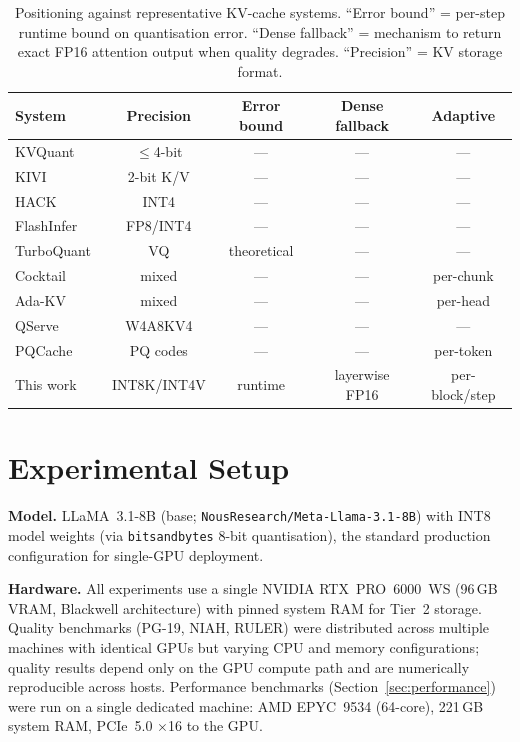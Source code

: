 \documentclass[10pt,twocolumn,a4paper]{article}
\theoremstyle{definition}
\theoremstyle{remark}
\begin{document}
\begin{table}[!t]
\centering
\caption{Positioning against representative KV-cache systems.  ``Error bound'' = per-step runtime bound on quantisation error.  ``Dense fallback'' = mechanism to return exact FP16 attention output when quality degrades.  ``Precision'' = KV storage format.}
\label{tab:positioning}
\small
\begin{tabular}{lcccc}
\toprule
\textbf{System} & \textbf{Precision} & \textbf{Error bound} & \textbf{Dense fallback} & \textbf{Adaptive} \\
\midrule
KVQuant~\cite{kvquant} & $\leq$4-bit & --- & --- & --- \\
KIVI~\cite{kivi} & 2-bit K/V & --- & --- & --- \\
HACK~\cite{hack} & INT4 & --- & --- & --- \\
FlashInfer~\cite{flashinfer} & FP8/INT4 & --- & --- & --- \\
TurboQuant~\cite{turboquant} & VQ & theoretical & --- & --- \\
Cocktail~\cite{cocktail} & mixed & --- & --- & per-chunk \\
Ada-KV~\cite{adakv} & mixed & --- & --- & per-head \\
QServe~\cite{qserve} & W4A8KV4 & --- & --- & --- \\
PQCache~\cite{pqcache} & PQ codes & --- & --- & per-token \\
\midrule
This work & INT8K/INT4V & runtime & layerwise FP16 & per-block/step \\
\bottomrule
\end{tabular}
\end{table}

\section{Experimental Setup}
\label{sec:setup}

\textbf{Model.}  LLaMA~3.1-8B (base; \texttt{NousResearch/Meta-Llama-3.1-8B}) with INT8 model weights (via \texttt{bitsandbytes} 8-bit quantisation), the standard production configuration for single-GPU deployment.

\textbf{Hardware.}  All experiments use a single NVIDIA RTX~PRO~6000~WS (96\,GB VRAM, Blackwell architecture) with pinned system RAM for Tier~2 storage.  Quality benchmarks (PG-19, NIAH, RULER) were distributed across multiple machines with identical GPUs but varying CPU and memory configurations; quality results depend only on the GPU compute path and are numerically reproducible across hosts.  Performance benchmarks (Section~\ref{sec:performance}) were run on a single dedicated machine: AMD EPYC~9534 (64-core), 221\,GB system RAM, PCIe~5.0 $\times$16 to the GPU.
\end{document}
